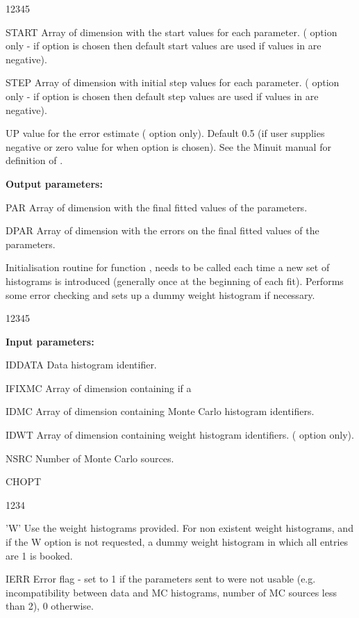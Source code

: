 \begin{changebar}
\begin{DLtt}{12345}
\item[START] Array of dimension  with the start values for
each parameter. ( option only - if  option is chosen
then default start values are used if values in 
are negative).
\item[STEP] Array of dimension  with initial step values for
each parameter. ( option only - if  option is chosen
then default step values are used if values in  are negative).
\item[UP]  value for the error estimate ( option only).  Default
0.5 (if user supplies negative or zero value for  when  option is
chosen). See the Minuit manual for definition of .
 
\item[{\rm\bf Output parameters:}]
\item[PAR] Array of dimension  with the final fitted values
of the parameters.
\item[DPAR] Array of dimension  with the errors
on the final fitted values of the parameters.
\end{DLtt}

 
\Action
Initialisation routine for function , needs to be called
each time a new set of histograms is introduced (generally once at the
beginning of each fit). Performs some error checking and sets up a dummy
weight histogram if necessary.
 
\begin{DLtt}{12345}
\item[{\rm\bf Input parameters:}]
\item[IDDATA] Data histogram identifier.
\item[IFIXMC] Array of dimension  containing  if a
\item[IDMC] Array of dimension  containing Monte Carlo histogram
identifiers.
\item[IDWT] Array of dimension  containing weight histogram
identifiers. ( option only).
\item[NSRC] Number of Monte Carlo sources.
\item[CHOPT]
\begin{DLtt}{1234}
\item['W'] Use the weight histograms provided.  For non existent weight
histograms, and if the W option is not requested, a dummy weight histogram
in which all entries are 1 is booked.
\item[IERR] Error flag - set to 1 if the parameters sent to 
were not usable (e.g. incompatibility between data and MC histograms,
number of MC sources less than 2), 0 otherwise.
\end{DLtt}
\end{DLtt}
 

\end{changebar}
